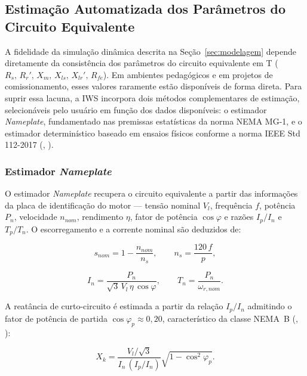\documentclass[a4paper]{ifacconf}
\begin{document}
\subsection{Estimação Automatizada dos Parâmetros do Circuito Equivalente}
\label{subsec:estimacao_parametros}

A fidelidade da simulação dinâmica descrita na Seção~\ref{sec:modelagem} depende diretamente da consistência dos parâmetros do circuito equivalente em T ($R_s,\,R_r',\,X_m,\,X_{ls},\,X_{lr}',\,R_{fe}$). Em ambientes pedagógicos e em projetos de comissionamento, esses valores raramente estão disponíveis de forma direta. Para suprir essa lacuna, a IWS incorpora dois métodos complementares de estimação, selecionáveis pelo usuário em função dos dados disponíveis: o estimador \textit{Nameplate}, fundamentado nas premissas estatísticas da norma NEMA MG-1, e o estimador determinístico baseado em ensaios físicos conforme a norma IEEE Std 112-2017 (\citeauthor{ieee112_2017}, \citeyear{ieee112_2017}).

\subsubsection{Estimador \textit{Nameplate}}

O estimador \textit{Nameplate} recupera o circuito equivalente a partir das informações da placa de identificação do motor --- tensão nominal $V_l$, frequência $f$, potência $P_n$, velocidade $n_{nom}$, rendimento $\eta$, fator de potência $\cos\varphi$ e razões $I_p/I_n$ e $T_p/T_n$. O escorregamento e a corrente nominal são deduzidos de:

\begin{equation}
\label{eq:nameplate_snom}
s_{nom} = 1 - \frac{n_{nom}}{n_s}, \qquad n_s = \frac{120\,f}{p},
\end{equation}

\begin{equation}
\label{eq:nameplate_in}
I_n = \frac{P_n}{\sqrt{3}\,V_l\,\eta\,\cos\varphi}, \qquad T_n = \frac{P_n}{\omega_{r,nom}}.
\end{equation}

A reatância de curto-circuito é estimada a partir da relação $I_p/I_n$ admitindo o fator de potência de partida $\cos\varphi_p \approx 0{,}20$, característico da classe NEMA~B (\citeauthor{li2010simulation}, \citeyear{li2010simulation}):

\begin{equation}
\label{eq:nameplate_xk}
X_k = \frac{V_l/\sqrt{3}}{I_n\,(I_p/I_n)}\sqrt{1 - \cos^2\!\varphi_p}.
\end{equation}
\end{document}
